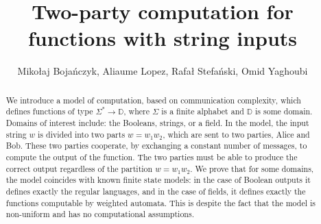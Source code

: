 \documentclass{article}
\newcommand{\domain}{\mathbb D}
\begin{document}
\title{Two-party computation for functions with string inputs}
\author{Miko{\l}aj Boja\'nczyk, Aliaume Lopez, Rafa{\l} Stefa\'nski, Omid Yaghoubi }

\maketitle 
\begin{abstract}
 We introduce a model of computation, based on communication complexity,  which defines functions of type $\Sigma^* \to \domain$, where $\Sigma$ is a finite alphabet and $\domain$ is some domain. Domains of interest include: the Booleans, strings, or a field. In the model, the input string $w$ is divided into two parts $w=w_1 w_2$, which are sent to two parties, Alice and Bob. These two parties cooperate, by exchanging a constant number of messages, to compute the output of the function. The two parties must be able to produce the correct output regardless of the partition $w = w_1 w_2$. We prove that for some domains, the model coincides with known finite state models: in the case of Boolean outputs it defines exactly the regular languages, and in the case of fields, it defines exactly the functions computable by weighted automata. This is despite the fact that the model is non-uniform and has no computational assumptions. 
\end{abstract}















\end{document}
